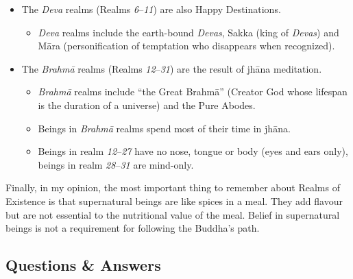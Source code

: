 \begin{itemize}
\begin{itemize}
\begin{itemize}
\end{itemize}

\end{itemize}

\item The \textit{Deva} realms (Realms \textit{6}--\textit{11}) are also Happy Destinations.

\begin{itemize}

\item \textit{Deva} realms include the earth-bound \textit{Devas}, Sakka (king of \textit{Devas}) and Māra (personification of temptation who disappears when recognized).

\end{itemize}

\item The \textit{Brahmā} realms (Realms \textit{12}--\textit{31}) are the result of jhāna meditation.

\begin{itemize}

\item \textit{Brahmā} realms include “the Great Brahmā” (Creator God whose lifespan is the duration of a universe) and the Pure Abodes.

\item Beings in \textit{Brahmā} realms spend most of their time in jhāna.

\item Beings in realm \textit{12}--\textit{27} have no nose, tongue or body (eyes and ears only), beings in realm \textit{28}--\textit{31} are mind-only.

\end{itemize}

\end{itemize}

Finally, in my opinion, the most important thing to remember about Realms of Existence is that supernatural beings are like spices in a meal. They add flavour but are not essential to the nutritional value of the meal. Belief in supernatural beings is not a requirement for following the Buddha’s path.

\newpage

\subsection*{Questions \& Answers}


